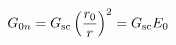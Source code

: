 \documentclass[border=3pt]{standalone}
\begin{document}
\pagecolor{bg}\color{fg}
$\displaystyle G_{0n}=G_{\rm sc}\left(\frac{r_0}{r}\right)^2=G_{\rm sc}E_0$
\end{document}
